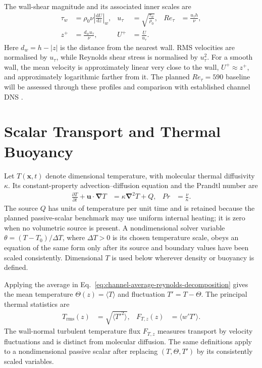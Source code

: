 The wall-shear magnitude and its associated inner scales are
\begin{equation}
  \begin{aligned}
    \tau_w&=\rho_0\nu
      \left|\frac{\mathrm{d}U}{\mathrm{d}z}\right|_w,
    &u_\tau&=\sqrt{\frac{\tau_w}{\rho_0}},
    &Re_\tau&=\frac{u_\tau h}{\nu},\\
    z^+&=\frac{d_wu_\tau}{\nu},
    &U^+&=\frac{U}{u_\tau}.
  \end{aligned}
  \label{eq:wall-friction-scales}
\end{equation}
Here $d_w=h-|z|$ is the distance from the nearest wall. RMS velocities are
normalised by $u_\tau$, while Reynolds shear stress is normalised by
$u_\tau^2$. For a smooth wall, the mean velocity is approximately linear very
close to the wall, $U^+\approx z^+$, and approximately logarithmic farther
from it. The planned $Re_\tau=590$ baseline will be assessed through these
profiles and comparison with established channel DNS
\cite{moserKimMansour1999}.

\section{Scalar Transport and Thermal Buoyancy}
\label{sec:scalar-transport-thermal-buoyancy}

Let $T(\mathbf{x},t)$ denote dimensional temperature, with molecular thermal
diffusivity $\kappa$. Its constant-property advection--diffusion equation and
the Prandtl number are
\begin{equation}
  \begin{aligned}
    \frac{\partial T}{\partial t}
      +\mathbf{u}\mathbin{\cdot}\boldsymbol{\nabla}T
      &=\kappa\boldsymbol{\nabla}^2T+Q,
    &Pr&=\frac{\nu}{\kappa}.
  \end{aligned}
  \label{eq:temperature-transport-prandtl}
\end{equation}
The source $Q$ has units of temperature per unit time and is retained because
the planned passive-scalar benchmark may use uniform internal heating; it is
zero when no volumetric source is present. A nondimensional solver variable
$\theta=(T-T_0)/\Delta T$, where $\Delta T>0$ is its chosen temperature
scale, obeys an equation of the same form only after its source and boundary
values have been scaled consistently. Dimensional $T$ is used below wherever
density or buoyancy is defined.

Applying the average in Eq.~\eqref{eq:channel-average-reynolds-decomposition}
gives the mean temperature $\Theta(z)=\langle T\rangle$ and fluctuation
$T'=T-\Theta$. The principal thermal statistics are
\begin{equation}
  \begin{aligned}
    T_{\mathrm{rms}}(z)&=\sqrt{\langle T'^2\rangle},
    &F_{T,z}(z)&=\langle w'T'\rangle.
  \end{aligned}
  \label{eq:temperature-statistics}
\end{equation}
The wall-normal turbulent temperature flux $F_{T,z}$ measures transport by
velocity fluctuations and is distinct from molecular diffusion. The same
definitions apply to a nondimensional passive scalar after replacing
$(T,\Theta,T')$ by its consistently scaled variables.

